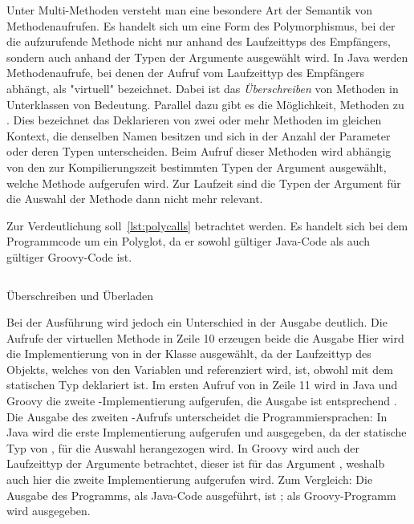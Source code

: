 	Unter Multi-Methoden versteht man eine besondere Art der Semantik von Methodenaufrufen.
	Es handelt sich um eine Form des Polymorphismus, bei der die aufzurufende Methode nicht nur anhand des Laufzeittyps des Empfängers, sondern auch anhand der Typen der Argumente ausgewählt wird.
	In Java werden Methodenaufrufe, bei denen der Aufruf vom Laufzeittyp des Empfängers abhängt, als "virtuell" bezeichnet.
	Dabei ist das \emph{Überschreiben} von Methoden in Unterklassen von Bedeutung.
	Parallel dazu gibt es die Möglichkeit, Methoden zu .
	Dies bezeichnet das Deklarieren von zwei oder mehr Methoden im gleichen Kontext, die denselben Namen besitzen und sich in der Anzahl der Parameter oder deren Typen unterscheiden.
	Beim Aufruf dieser Methoden wird abhängig von den zur Kompilierungszeit bestimmten Typen der Argument ausgewählt, welche Methode aufgerufen wird.
	Zur Laufzeit sind die Typen der Argument für die Auswahl der Methode dann nicht mehr relevant.

	Zur Verdeutlichung soll~\ref{lst:polycalls} betrachtet werden.
	Es handelt sich bei dem Programmcode um ein Polyglot,
	da er sowohl gültiger Java-Code als auch gültiger Groovy-Code ist.


	\begin{listing}[ht]
		\inputminted{java}{java/PolyCalls.java}
		\caption{Überschreiben und Überladen}
		\label{lst:polycalls}
	\end{listing}

	Bei der Ausführung wird jedoch ein Unterschied in der Ausgabe deutlich.
	Die Aufrufe der virtuellen Methode  in Zeile 10 erzeugen beide die Ausgabe 
	Hier wird die Implementierung von  in der Klasse  ausgewählt, da der Laufzeittyp des Objekts, welches von den Variablen  und  referenziert wird,  ist, obwohl  mit dem statischen Typ  deklariert ist.
	Im ersten Aufruf von  in Zeile 11 wird in Java und Groovy die zweite -Implementierung aufgerufen, die Ausgabe ist entsprechend .
	Die Ausgabe des zweiten -Aufrufs unterscheidet die Programmiersprachen:
	In Java wird die erste Implementierung aufgerufen und  ausgegeben, da der statische Typ von ,  für die Auswahl herangezogen wird.
	In Groovy wird auch der Laufzeittyp der Argumente betrachtet, dieser ist für das Argument  , weshalb auch hier die zweite Implementierung aufgerufen wird.
	Zum Vergleich:
	Die Ausgabe des Programms, als Java-Code ausgeführt, ist ;
	als Groovy-Programm wird  ausgegeben.

